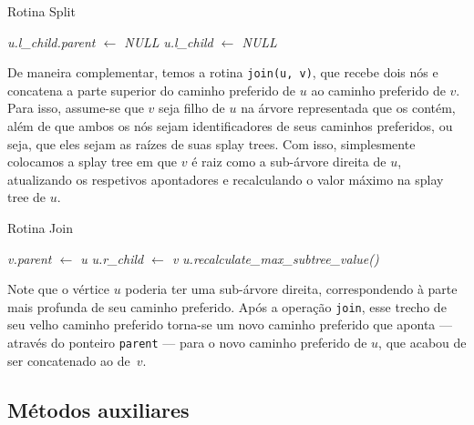 \begin{algorithm}[h!]
    \caption{Rotina Split}\label{splay:split}
    \begin{algorithmic}[1]
        \State \emph{u.l\_child.parent $\gets$ NULL}
        \EndIf
        \State \emph{u.l\_child $\gets$ NULL}
        \EndFunction
    \end{algorithmic}
\end{algorithm}

De maneira complementar, temos a rotina \texttt{join(u, v)}, que recebe dois nós e concatena a parte superior do caminho preferido de $u$ ao caminho preferido de $v$. Para isso, assume-se que $v$ seja filho de $u$ na árvore representada que os contém, além de que ambos os nós sejam identificadores de seus caminhos preferidos, ou seja, que eles sejam as raízes de suas splay trees. Com isso, simplesmente colocamos a splay tree em que $v$ é raiz como a sub-árvore direita de $u$, atualizando os respetivos apontadores e recalculando o valor máximo na splay tree de $u$.

\begin{algorithm}[h!]
    \caption{Rotina Join}\label{splay:join}
    \begin{algorithmic}[1]
        \State \emph{v.parent $\gets$ u}
        \EndIf
        \State \emph{u.r\_child $\gets$ v}
        \State {}
        \State \emph{u.recalculate\_max\_subtree\_value()}
        \EndFunction
    \end{algorithmic}
\end{algorithm}

Note que o vértice $u$ poderia ter uma sub-árvore direita, correspondendo à parte mais profunda de seu caminho preferido. Após a operação \texttt{join}, esse trecho de seu velho caminho preferido torna-se um novo caminho preferido que aponta --- através do ponteiro \texttt{parent} --- para o novo caminho preferido de $u$, que acabou de ser concatenado ao de~$v$.

\subsection{Métodos auxiliares}
\label{subsection:lct-splay-aux}

